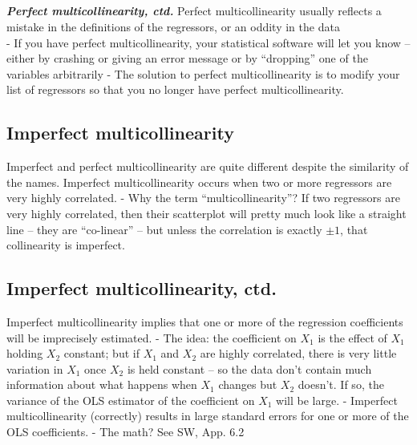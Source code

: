 \documentclass[
  letterpaper,
  DIV=11,
  numbers=noendperiod]{scrartcl}
\begin{document}
\hypertarget{section-12}{%
\subsection{}\label{section-12}}

\textbf{\emph{Perfect multicollinearity, ctd.}} Perfect
multicollinearity usually reflects a mistake in the definitions of the
regressors, or an oddity in the data\\
- If you have perfect multicollinearity, your statistical software will
let you know -- either by crashing or giving an error message or by
``dropping'' one of the variables arbitrarily - The solution to perfect
multicollinearity is to modify your list of regressors so that you no
longer have perfect multicollinearity.

\hypertarget{imperfect-multicollinearity}{%
\subsection{Imperfect
multicollinearity}\label{imperfect-multicollinearity}}

Imperfect and perfect multicollinearity are quite different despite the
similarity of the names. Imperfect multicollinearity occurs when two or
more regressors are very highly correlated. - Why the term
``multicollinearity''? If two regressors are very highly correlated,
then their scatterplot will pretty much look like a straight line --
they are ``co-linear'' -- but unless the correlation is exactly
\(\pm1\), that collinearity is imperfect.

\hypertarget{imperfect-multicollinearity-ctd.}{%
\subsection{Imperfect multicollinearity,
ctd.}\label{imperfect-multicollinearity-ctd.}}

Imperfect multicollinearity implies that one or more of the regression
coefficients will be imprecisely estimated. - The idea: the coefficient
on \(X_1\) is the effect of \(X_1\) holding \(X_2\) constant; but if
\(X_1\) and \(X_2\) are highly correlated, there is very little
variation in \(X_1\) once \(X_2\) is held constant -- so the data don't
contain much information about what happens when \(X_1\) changes but
\(X_2\) doesn't. If so, the variance of the OLS estimator of the
coefficient on \(X_1\) will be large. - Imperfect multicollinearity
(correctly) results in large standard errors for one or more of the OLS
coefficients. - The math? See SW, App. 6.2
\end{document}
